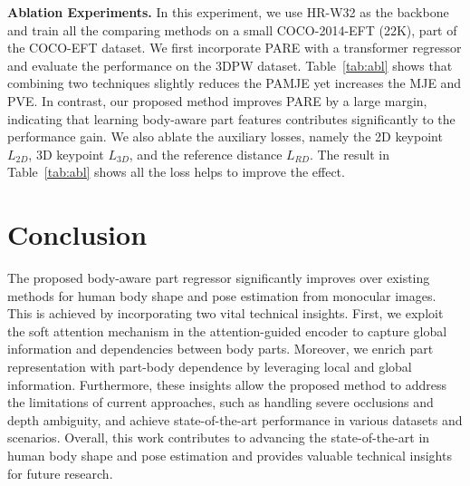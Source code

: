 \documentclass[10pt,twocolumn,letterpaper]{article}
\begin{document}
\noindent\textbf{Ablation Experiments.}
In this experiment, we use HR-W32 as the backbone and train all the comparing methods on a small COCO-2014-EFT (22K), part of the COCO-EFT dataset.  We first incorporate PARE with a transformer regressor and evaluate the performance on the 3DPW dataset. Table~\ref{tab:abl} shows that combining two techniques slightly reduces the PAMJE yet  increases the MJE and PVE.  In contrast, our proposed method improves PARE by a large margin, indicating that learning body-aware part features contributes significantly to the performance gain. We also ablate the auxiliary losses, namely the 2D keypoint $L_{2D}$, 3D keypoint $L_{3D}$, and the reference distance $L_{RD}$. The result in Table~\ref{tab:abl} shows all the loss helps to improve the effect.






\section{Conclusion}
The proposed body-aware part regressor significantly improves over existing methods for human body shape and pose estimation from monocular images. This is achieved by incorporating two vital technical insights. First, we exploit the soft attention mechanism in the attention-guided encoder to capture global information and dependencies between body parts. Moreover, we enrich part representation with part-body dependence by leveraging local and global information. Furthermore, these insights allow the proposed method to address the limitations of current approaches, such as handling severe occlusions and depth ambiguity, and achieve state-of-the-art performance in various datasets and scenarios. Overall, this work contributes to advancing the state-of-the-art in human body shape and pose estimation and provides valuable technical insights for future research.
{\small


}
\end{document}
